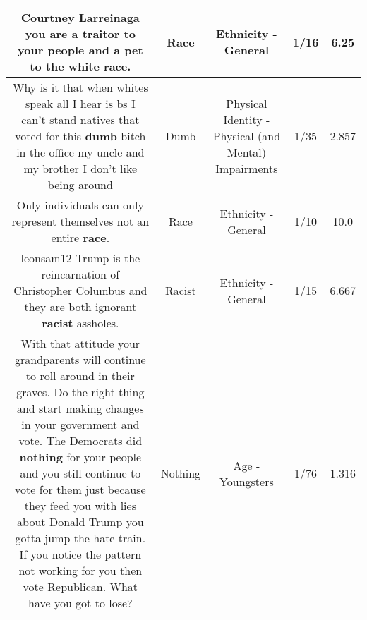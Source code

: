 \documentclass[11pt]{article}
\newlength\mylength
\begin{document}
\begin{center}
\begin{longtable}{|C{.65\mylength}|C{.30\mylength}|C{.12\mylength}|C{.12\mylength}|C{.12\mylength}|}
  \small Courtney Larreinaga you are a traitor to your people and a pet to the white \textbf{race}.\normalsize   & Race & Ethnicity - General & 1/16 & 6.25 \\  \hline
  \small Why is it that when whites speak all I hear is bs I can't stand natives that voted for this \textbf{dumb} bitch in the office my uncle and my brother I don't like being around\normalsize   & Dumb & Physical Identity - Physical (and Mental) Impairments & 1/35 & 2.857 \\  \hline
  \small Only individuals can only represent themselves not an entire \textbf{race}.\normalsize   & Race & Ethnicity - General & 1/10 & 10.0 \\  \hline
  \small leonsam12 Trump is the reincarnation of Christopher Columbus and they are both ignorant \textbf{racist} assholes.\normalsize   & Racist & Ethnicity - General & 1/15 & 6.667 \\  \hline
  \small {} With that attitude your grandparents will continue to roll around in their graves. Do the right thing and start making changes in your government and vote. The Democrats did \textbf{nothing} for your people and you still continue to vote for them just because they feed you with lies about Donald Trump you gotta jump the hate train. If you notice the pattern not working for you then vote Republican. What have you got to lose?\normalsize   & Nothing & Age - Youngsters & 1/76 & 1.316 \\  \hline

\end{longtable}
\end{center}
\end{document}
